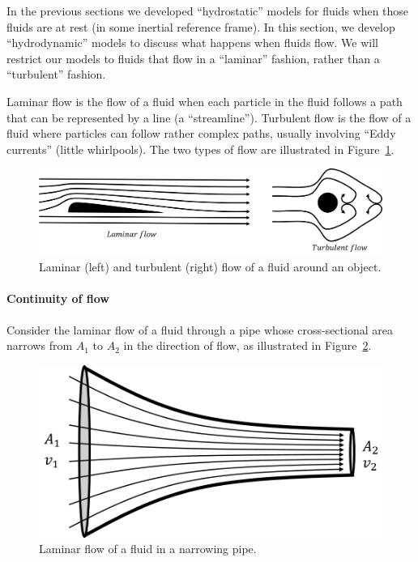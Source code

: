 In the previous sections we developed ``hydrostatic'' models for fluids when those fluids are at rest (in some inertial reference frame). In this section, we develop ``hydrodynamic'' models to discuss what happens when fluids flow. We will restrict our models to fluids that flow in a ``laminar'' fashion, rather than a ``turbulent'' fashion.

Laminar flow is the flow of a fluid when each particle in the fluid follows a path that can be represented by a line (a ``streamline''). Turbulent flow is the flow of a fluid where particles can follow rather complex paths, usually involving ``Eddy currents'' (little whirlpools). The two types of flow are illustrated in Figure~\ref{fig:fluidmechanics:turbulent}.

\begin{figure}[!htbp]
\centering
\includegraphics[width=0.7\linewidth]{files/turbulent-3667d33728ed1bb7e6ff66cd9ff97f34.png}
\caption[]{Laminar (left) and turbulent (right) flow of a fluid around an object.}
\label{fig:fluidmechanics:turbulent}
\end{figure}

\paragraph{Continuity of flow}\label{sec:fluidmechanics:continuity}

Consider the laminar flow of a fluid through a pipe whose cross-sectional area narrows from $A_1$ to $A_2$ in the direction of flow, as illustrated in Figure~\ref{fig:fluidmechanics:continuous}.

\begin{figure}[!htbp]
\centering
\includegraphics[width=0.6\linewidth]{files/continuous-9fe71e3af537f52ce783298d23745ef9.png}
\caption[]{Laminar flow of a fluid in a narrowing pipe.}
\label{fig:fluidmechanics:continuous}
\end{figure}

